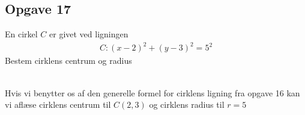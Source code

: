 \subsection{Opgave 17}

En cirkel $C$ er givet ved ligningen
\begin{align*}
    C:(x-2)^2 + (y-3)^2 = 5^2
\end{align*}
Bestem cirklens centrum og radius\\\\

\ans

Hvis vi benytter os af den generelle formel for cirklens ligning fra opgave 16 kan vi aflæse cirklens centrum til $C(2,3)$ og cirklens radius til $r = 5$

